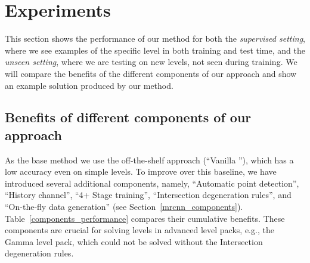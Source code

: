 \section{Experiments}
\label{experiments_section}
This section shows the performance of our method for both the {\em supervised setting}, where we see examples of the specific level in both training and test time, and the {\em unseen setting}, where we are testing on new levels, not seen during training.
We will compare the benefits of the different components of our approach and show an example solution produced by our method.

\subsection{Benefits of different components of our approach}
As the base method we use the off-the-shelf \maskrcnn approach (``Vanilla \maskrcnn''), which has a low accuracy even on simple \alphapack levels.
To improve over this baseline, we have introduced several additional components, namely, ``Automatic point detection'', ``History channel'', ``4+ Stage training'', ``Intersection degeneration rules'', and ``On-the-fly data generation'' (see Section~\ref{mrcnn_components}).
Table~\ref{components_performance} compares their cumulative benefits.
These components are crucial for solving levels in advanced level packs, e.g., the Gamma level pack, which could not be solved without the Intersection degeneration rules.

